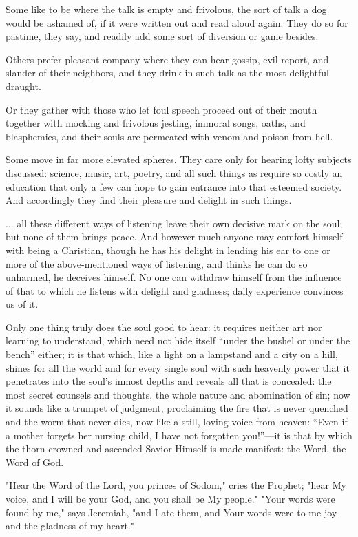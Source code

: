 Some like to be where the talk is empty and frivolous, the sort of talk a dog would be ashamed of, if it were written out and read aloud again. They do so for pastime, they say, and readily add some sort of diversion or game besides.

Others prefer pleasant company where they can hear gossip, evil report, and slander of their neighbors, and they drink in such talk as the most delightful draught.

Or they gather with those who let foul speech proceed out of their mouth together with mocking and frivolous jesting, immoral songs, oaths, and blasphemies, and their souls are permeated with venom and poison from hell.

Some move in far more elevated spheres. They care only for hearing lofty subjects discussed: science, music, art, poetry, and all such things as require so costly an education that only a few can hope to gain entrance into that esteemed society. And accordingly they find their pleasure and delight in such things.

... all these different ways of listening leave their own decisive mark on the soul; but none of them brings peace. And however much anyone may comfort himself with being a Christian, though he has his delight in lending his ear to one or more of the above-mentioned ways of listening, and thinks he can do so unharmed, he deceives himself. No one can withdraw himself from the influence of that to which he listens with delight and gladness; daily experience convinces us of it.

Only one thing truly does the soul good to hear: it requires neither art nor learning to understand, which need not hide itself “under the bushel or under the bench” either; it is that which, like a light on a lampstand and a city on a hill, shines for all the world and for every single soul with such heavenly power that it penetrates into the soul’s inmost depths and reveals all that is concealed: the most secret counsels and thoughts, the whole nature and abomination of sin; now it sounds like a trumpet of judgment, proclaiming the fire that is never quenched and the worm that never dies, now like a still, loving voice from heaven: “Even if a mother forgets her nursing child, I have not forgotten you!”—it is that by which the thorn-crowned and ascended Savior Himself is made manifest: the Word, the Word of God.

"Hear the Word of the Lord, you princes of Sodom," cries the Prophet; "hear My voice, and I will be your God, and you shall be My people." "Your words were found by me," says Jeremiah, "and I ate them, and Your words were to me joy and the gladness of my heart."

